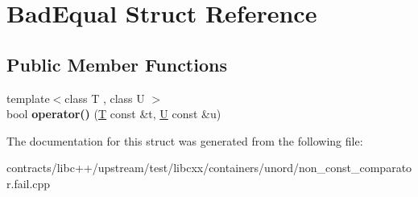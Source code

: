 \hypertarget{struct_bad_equal}{}\section{Bad\+Equal Struct Reference}
\label{struct_bad_equal}
\subsection*{Public Member Functions}
\begin{DoxyCompactItemize}
\item 
\mbox{\label{struct_bad_equal_aa8d95f15e388bae53316f441b3e3f135}} 
{\footnotesize template$<$class T , class U $>$ }\\bool {\bfseries operator()} (\mbox{\hyperlink{struct_t}{T}} const \&t, \mbox{\hyperlink{union_u}{U}} const \&u)
\end{DoxyCompactItemize}


The documentation for this struct was generated from the following file\+:\begin{DoxyCompactItemize}
\item 
contracts/libc++/upstream/test/libcxx/containers/unord/non\+\_\+const\+\_\+comparator.\+fail.\+cpp\end{DoxyCompactItemize}
